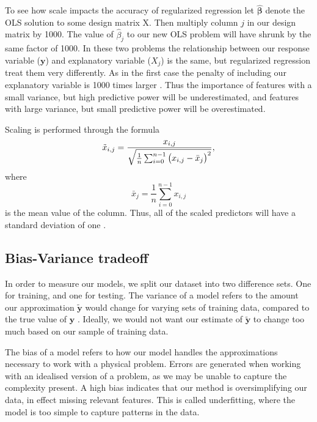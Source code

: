 \documentclass{article}
\begin{document}
To see how scale impacts the accuracy of regularized regression let $\boldsymbol{\hat{\beta}}$ denote the OLS solution to some design matrix X. Then multiply column $j$ in our design matrix by 1000. The value of $\hat{\beta}_j$ to our new OLS problem will have shrunk by the same factor of 1000. In these two problems the relationship between our response variable ($\boldsymbol{y}$) and explanatory variable ($X_j$) is the same, but regularized regression treat them very differently. As in the first case the penalty of including our explanatory variable is 1000 times larger \cite[p.~237]{james2021introduction}. Thus the importance of features with a small variance, but high predictive power will be underestimated, and features with large variance, but small predictive power will be overestimated.

Scaling is performed through the formula
\begin{equation*}
    \tilde{x}_{i,j} = \frac{x_{i,j}}{\sqrt{\frac{1}{n} \sum_{i=0}^{n-1} \left( x_{i,j} - \Bar{x}_j \right)^2 }},
\end{equation*}
where 
\begin{equation*}
    \bar{x}_j = \frac{1}{n} \sum_{i=0}^{n-1} x_{i,j}
\end{equation*}
is the mean value of the column. Thus, all of the scaled predictors will have a standard deviation of one \cite[p.~237]{james2021introduction}.

\subsection{Bias-Variance tradeoff}
In order to measure our models, we split our dataset into two difference sets. One for training, and one for testing. The variance of a model refers to the amount our approximation $\boldsymbol{\tilde{y}}$ would change for varying sets of training data, compared to the true value of $\boldsymbol{y}$ \cite[p.~34]{james2021introduction}. Ideally, we would not want our estimate of $\boldsymbol{\tilde{y}}$ to change too much based on our sample of training data.

The bias of a model refers to how our model handles the approximations necessary to work with a physical problem. Errors are generated when working with an idealised version of a problem, as we may be unable to capture the complexity present. A high bias indicates that our method is oversimplifying our data, in effect missing relevant features. This is called underfitting, where the model is too simple to capture patterns in the data.
\end{document}
